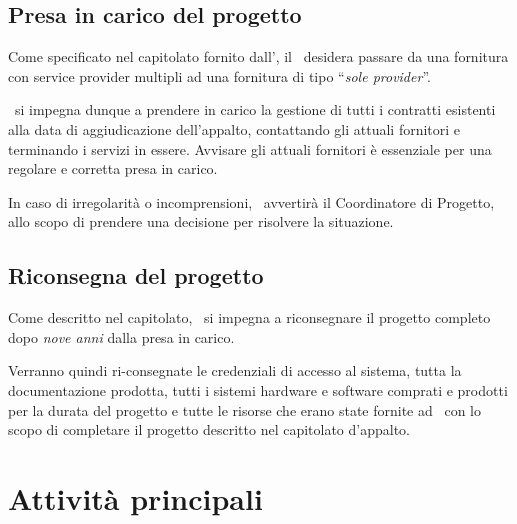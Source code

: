 	\subsection{Presa in carico del progetto}
	
		Come specificato nel capitolato fornito dall'\istituto, il \proponente~desidera passare da una fornitura con service provider multipli ad una fornitura di tipo ``\textit{sole provider}''.
	
		\azienda~si impegna dunque a prendere in carico la gestione di tutti i contratti esistenti alla data di aggiudicazione dell'appalto, contattando gli attuali fornitori e terminando i servizi in essere.
		Avvisare gli attuali fornitori è essenziale per una regolare e corretta presa in carico.
		
		In caso di irregolarità o incomprensioni, \azienda~avvertirà il Coordinatore di Progetto, allo scopo di prendere una decisione per risolvere la situazione.
	
	\subsection{Riconsegna del progetto}
	
		Come descritto nel capitolato, \azienda~si impegna a riconsegnare il progetto completo dopo \textit{nove anni} dalla presa in carico.

		Verranno quindi ri-consegnate le credenziali di accesso al sistema, tutta la documentazione prodotta, tutti i sistemi hardware e software comprati e prodotti per la durata del progetto e tutte le risorse che erano state fornite ad \azienda~con lo scopo di completare il progetto descritto nel capitolato d'appalto.

\section{Attività principali}\label{sec:attivita_principali}

